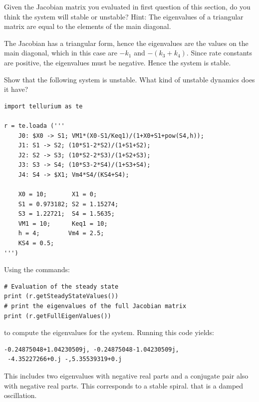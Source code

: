 \documentclass[12pt]{article}
\begin{document}
\begin{question}
Given the Jacobian matrix you evaluated in first question of this section, do you think the system will stable or unstable? Hint: The eigenvalues of a triangular matrix are equal to the elements of the main diagonal.
\end{question}
\begin{solution}
The Jacobian has a triangular form, hence the eigenvalues are the values on the main diagonal, which in this case are $-k_1$ and $-(k_3+k_4)$. Since rate constants are positive, the eigenvalues must be negative. Hence the system is stable.
\end{solution}


\cprotEnv\begin{question}
Show that the following system is unstable. What kind of unstable dynamics does it have?

\begin{verbatim}
import tellurium as te

r = te.loada ('''
    J0: $X0 -> S1; VM1*(X0-S1/Keq1)/(1+X0+S1+pow(S4,h));
    J1: S1 -> S2; (10*S1-2*S2)/(1+S1+S2);
    J2: S2 -> S3; (10*S2-2*S3)/(1+S2+S3);
    J3: S3 -> S4; (10*S3-2*S4)/(1+S3+S4);
    J4: S4 -> $X1; Vm4*S4/(KS4+S4);

    X0 = 10;       X1 = 0;
    S1 = 0.973182; S2 = 1.15274;
    S3 = 1.22721;  S4 = 1.5635;
    VM1 = 10;      Keq1 = 10;
    h = 4;        Vm4 = 2.5;
    KS4 = 0.5;
''')
\end{verbatim}
\end{question}
\cprotEnv\begin{solution}

Using the commands:
\begin{verbatim}
# Evaluation of the steady state
print (r.getSteadyStateValues())
# print the eigenvalues of the full Jacobian matrix
print (r.getFullEigenValues())
\end{verbatim}
to compute the eigenvalues for the system. Running this code yields:
\begin{verbatim}
-0.24875048+1.04230509j, -0.24875048-1.04230509j,
 -4.35227266+0.j -,5.35539319+0.j
\end{verbatim}
This includes two eigenvalues with negative real parts and a conjugate pair also with negative real parts. This corresponds to a stable spiral. that is a damped oscillation.
\end{solution}
\end{document}
